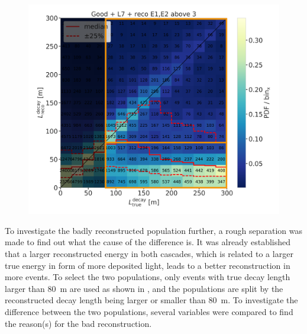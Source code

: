 \begin{figure}[h]
    \includegraphics{figures/results/190607/second_population/190607_millipede_level_no_NaNs_NEW_flipped_reco_decayL_vs_true_decayL_reco_above3_step_contours_populations.png}
    \caption[]{}
\end{figure}

To investigate the badly reconstructed population further, a rough separation was made to find out what the cause of the difference is. It was already established that a larger reconstructed energy in both cascades, which is related to a larger true energy in form of more deposited light, leads to a better reconstruction in more events. To select the two populations, only events with true decay length larger than \SI{80}{\meter} are used as shown in , and the populations are split by the reconstructed decay length being larger or smaller than \SI{80}{\meter}. To investigate the difference between the two populations, several variables were compared to find the reason(s) for the bad reconstruction. 

